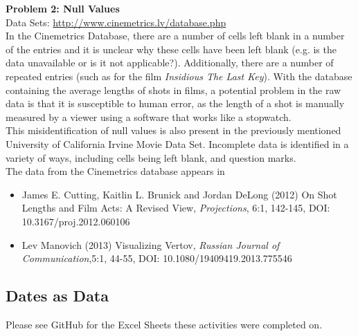 \documentclass{article}
\begin{document}
\begin{FlushLeft}
\textbf{Problem 2: Null Values}\\
Data Sets: \url{http://www.cinemetrics.lv/database.php}\\
In the Cinemetrics Database, there are a number of cells left blank in a number of the entries and it is unclear why these cells have been left blank (e.g. is the data unavailable or is it not applicable?). Additionally, there are a number of repeated entries (such as for the film \textit{Insidious The Last Key}). With the database containing the average lengths of shots in films, a potential problem in the raw data is that it is susceptible to human error, as the length of a shot is manually measured by a viewer using a software that works like a stopwatch.\\
This misidentification of null values is also present in the previously mentioned University of California Irvine Movie Data Set. Incomplete data is identified in a variety of ways, including cells being left blank, and question marks.\\ 
The data from the Cinemetrics database appears in
\begin{itemize}
    \item James E. Cutting, Kaitlin L. Brunick and Jordan DeLong (2012) On Shot Lengths and Film Acts: A Revised View, \textit{Projections}, 6:1, 142-145, DOI: 10.3167/proj.2012.060106
    \item Lev Manovich (2013) Visualizing Vertov, \textit{Russian Journal of Communication},5:1, 44-55, DOI: 10.1080/19409419.2013.775546
\end{itemize}

\subsection{Dates as Data}
Please see GitHub for the Excel Sheets these activities were completed on.

\end{FlushLeft}
\end{document}
